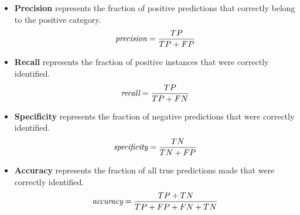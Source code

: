 \begin{itemize}
  \item \textbf{Precision} represents the fraction of positive predictions that correctly belong to the positive category.
  \begin{equation}
    \emph{$\text{precision} = \frac{TP}{TP + FP}$}
    \label{equ:precision}
  \end{equation}

  \item \textbf{Recall} represents the fraction of positive instances that were correctly identified.
  \begin{equation}
    \emph{$\text{recall} = \frac{TP}{TP + FN}$}
    \label{equ:recall}
  \end{equation}

  \item \textbf{Specificity} represents the fraction of negative predictions that were correctly identified.
  \begin{equation}
    \emph{$\text{specificity} = \frac{TN}{TN + FP}$}
    \label{equ:specificity}
  \end{equation}

  \item \textbf{Accuracy} represents the fraction of all true predictions made that were correctly identified.
  \begin{equation}
    \emph{$\text{accuracy} = \frac{TP + TN}{TP + FP + FN + TN}$}
    \label{equ:accuracy}
  \end{equation}
\end{itemize}


